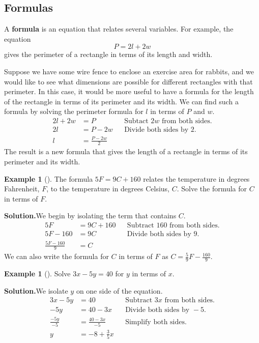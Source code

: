\documentclass[10pt,]{book}
\newcommand{\terminology}[1]{\textbf{#1}}
\theoremstyle{plain}
\theoremstyle{definition}
\theoremstyle{definition}
\newtheorem{example}[theorem]{Example}
\theoremstyle{definition}
\numberwithin{equation}{part}
\newcommand{\amp}{&}
\begin{document}
\subsection[{Formulas}]{Formulas}\label{subsection-10}
A \terminology{formula} is an equation that relates several variables. For example, the equation%
\begin{equation*}
P = 2l + 2w
\end{equation*}
gives the perimeter of a rectangle in terms of its length and width.%
\par
Suppose we have some wire fence to enclose an exercise area for rabbits, and we would like to see what dimensions are possible for different rectangles with that perimeter. In this case, it would be more useful to have a formula for the length of the rectangle in terms of its perimeter and its width. We can find such a formula by solving the perimeter formula for \(l\) in terms of \(P\) and \(w\).%
\begin{align*}
2l + 2w \amp= P \amp\amp\text{Subtact }2 w \text{ from both sides.}\\
2l \amp= P − 2w \amp\amp\text{Divide both sides by 2.}\\
l \amp= \frac{P − 2w}{2}
\end{align*}
The result is a new formula that gives the length of a rectangle in terms of its perimeter and its width.%
\begin{example}[]\label{example-13}
The formula \(5F = 9C + 160\) relates the temperature in degrees Fahrenheit, \(F\), to the temperature in degrees Celsius, \(C\). Solve the formula for \(C\) in terms of \(F\).%
\par\medskip\noindent%
\textbf{Solution.}\quad We begin by isolating the term that contains \(C\).%
\begin{align*}
5F \amp= 9C + 160 \amp\amp\text{Subtract 160 from both sides.}
\\
5F − 160 \amp = 9C \amp\amp\text{Divide both sides by 9.}
\\
\frac{5F − 160}{9} \amp =C
\end{align*}
We can also write the formula for \(C\) in terms of \(F\) as \(C = \frac{5}{9}F − \frac{160}{9}\).%
\end{example}
\begin{example}[]\label{example-14}
Solve \(3x − 5y = 40\) for \(y\) in terms of \(x\).%
\par\medskip\noindent%
\textbf{Solution.}\quad We isolate \(y\) on one side of the equation.%
\begin{align*}
3x − 5y \amp = 40\amp\amp\text{Subtract }3x \text{ from both sides.}
\\
−5y \amp = 40 − 3x\amp\amp\text{Divide both sides by }-5.
\\
\frac{−5y}{-5} \amp = \frac{40 − 3x}{-5}\amp\amp\text{Simplify both sides.}               
\\
y \amp = −8 + \frac{3}{5}x
\end{align*}
%
\end{example}
\typeout{************************************************}
\typeout{************************************************}
\end{document}

